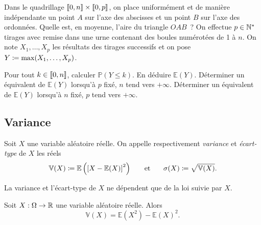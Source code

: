 \documentclass{magnolia}
\begin{document}
\begin{exos}
\exo Dans le quadrillage $\left\llbracket 0,n\right\rrbracket\times\left\llbracket 0,p\right\rrbracket$, on place uniformément et de manière indépendante
  un point $A$ sur l'axe des abscisses et un point $B$ sur l'axe
  des ordonnées. Quelle est, en moyenne, l'aire du triangle $OAB$~?
\exo On effectue $p\in{\mathbb{N}^*}$ tirages avec remise dans une urne contenant des boules numérotées
  de 1 à $n$. On note $X_1,\ldots,X_p$ les résultats des tirages successifs et on pose
  $Y\coloneqq\max(X_1,\ldots,X_p)$.
  \begin{questions}
  \question Pour tout $k\in\left\llbracket 0,n\right\rrbracket$, calculer $\mathbb{P}(Y\leq k)$. En déduire $\mathbb{E}(Y)$.
  \question Déterminer un équivalent de $\mathbb{E}(Y)$ lorsqu'à $p$ fixé, $n$ tend vers $+\infty$.
  \question Déterminer un équivalent de $\mathbb{E}(Y)$ lorsqu'à $n$ fixé, $p$ tend vers $+\infty$.
  \end{questions}
\end{exos}



\subsection{Variance}

\begin{definition}
Soit $X$ une variable aléatoire réelle. On appelle respectivement \emph{variance} et
\emph{écart-type} de $X$ les réels
\[\mathbb{V}(X)\coloneqq\mathbb{E}\left(\left[X-\mathbb{E}(X)\right]^2\right) \quad\quad\!\text{et}\quad\!\quad
  \sigma(X)\coloneqq\sqrt{\mathbb{V}(X)}.\]
\end{definition}

\begin{remarqueUnique}
\remarque La variance et l'écart-type de $X$ ne dépendent que de la loi suivie par $X$.
\end{remarqueUnique}

\begin{proposition}[nom={Formule de \nom{König-Huygens}}]
Soit $X:\Omega\to\mathbb{R}$ une variable aléatoire réelle. Alors
\[\mathbb{V}(X)=\mathbb{E}(X^2)-\mathbb{E}(X)^2.\]
\end{proposition}
\end{document}
